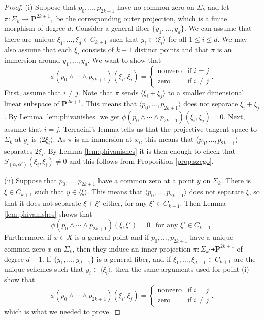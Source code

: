 \documentclass[12pt]{amsart}
\numberwithin{equation}{section}
\numberwithin{thmcounter}{section}
\theoremstyle{definition}
\theoremstyle{claim}
\newcommand{\nP}{\mathbf{P}}
\begin{document}
\begin{proof}
	\noindent
	(i)  Suppose that $p_0, \ldots, p_{2k+1}$ have no common zero on $\Sigma_k$ and let
	$
	\pi  \colon \Sigma_k \longrightarrow \nP^{2k+1},
	$
	be the corresponding outer projection,
	which is a finite morphism of degree $d$. Consider a general fiber $\{y_1, \ldots, y_d\}$. We can assume that there are unique $\xi_1, \ldots, \xi_d \in C_{k+1}$ such that $y_i \in \langle \xi_i \rangle$ for all $1 \leq i \leq d$. We may also assume that each $\xi_i$ consists of $k+1$ distinct points and that $\pi$ is an immersion around $y_1, \ldots, y_d$. We want to show that
	$$
	\phi(p_0 \wedge \cdots \wedge p_{2k+1})(\xi_i, \xi_j) =
	\begin{cases} \text{nonzero} & \text{if $i=j$} \\ \text{zero} & \text{if $i \neq j$} \end{cases}.
	$$
	First, assume that $i \neq j$. Note that $\pi$ sends $\langle \xi_i + \xi_j \rangle$ to a smaller dimensional linear subspace of $\nP^{2k+1}$. This means that $\langle p_0,\dots,p_{2k+1}\rangle$ does not separate $\xi_i+\xi_j$. By Lemma \ref{lem:phivanishes} we get $\phi(p_0 \wedge \cdots \wedge p_{2k+1})(\xi_i, \xi_j) = 0$. Next, assume that $i=j$. Terracini's lemma tells us that the projective tangent space to $\Sigma_{k}$ at $y_i$ is $\langle 2\xi_i \rangle$. As $\pi$ is an immersion at $x_i$, this means that $\langle p_0,\dots,p_{2k+1} \rangle$ separates $2\xi_i$. By Lemma \ref{lem:phivanishes} it is then enough to check that $S_{(\alpha,\alpha')}(\xi_i,\xi_i)\ne 0$ and this follows from Proposition \ref{prop:szego}.
	\medskip

	\noindent
	(ii) Suppose that $p_0, \ldots, p_{2k+1}$ have a common zero at a point $y$ on $\Sigma_k$. There is $\xi \in C_{k+1}$ such that $y\in \langle \xi \rangle$. This means that $\langle p_0,\dots,p_{2k+1} \rangle$ does not separate $\xi$, so that it does not separate $\xi+\xi'$ either, for any  $\xi'\in C_{k+1}$. Then Lemma \ref{lem:phivanishes} shows that
	$$
	\phi(p_0 \wedge \cdots \wedge p_{2k+1})(\xi, \xi')=0~~\text{ for any $\xi' \in C_{k+1}$}.
	$$
	Furthermore, if $x\in X$ is a general point and if $p_0,\dots,p_{2k+1}$ have a unique common zero $x$ on $\Sigma_k$, then they induce an inner projection $\pi\colon \Sigma_k \dashrightarrow \nP^{2k+1}$ of degree $d-1$. If $\{y_1,\dots,y_{d-1}\}$ is a general fiber, and if $\xi_1,\dots,\xi_{d-1} \in C_{k+1}$ are the unique schemes such that $y_i \in \langle \xi_i \rangle$, then the same arguments used for point (i) show that
	$$
	\phi(p_0 \wedge \cdots \wedge p_{2k+1})(\xi_i, \xi_j) =
	\begin{cases} \text{nonzero} & \text{if $i=j$} \\ \text{zero} & \text{if $i \neq j$} \end{cases}.
	$$
	which is what we needed to prove.
	\medskip


\end{proof}
\end{document}
